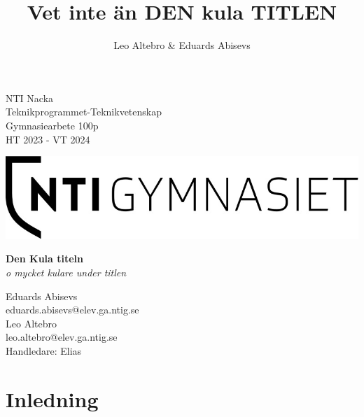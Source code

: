 \documentclass[a4paper]{article}
\title{Vet inte än DEN kula TITLEN}
\author{Leo Altebro & Eduards Abisevs}
\date{ }
\begin{document}
\begin{titlepage}
    \begin{minipage}[t]{0.48\textwidth}
        \raggedright
        NTI Nacka \\
        Teknikprogrammet-Teknikvetenskap \\
        Gymnasiearbete 100p \\
        HT 2023 - VT 2024
    \end{minipage}
    \hfill
    \begin{minipage}[t]{0.48\textwidth}
        \raggedleft
        \includegraphics[width=\linewidth]{images/logo.jpg} %
    \end{minipage}

    \vspace*{\fill} %

    \begin{center}
        \Large\textbf{Den Kula titeln}\\
        \large\textit{o mycket kulare under titlen}
    \end{center}

    \vspace*{\fill} %

    \begin{minipage}[b]{1\textwidth}
        \raggedright
        Eduards Abisevs\\
        eduards.abisevs@elev.ga.ntig.se\\
        Leo Altebro\\
        leo.altebro@elev.ga.ntig.se\\
        Handledare: Elias
    \end{minipage}
\end{titlepage}


\tableofcontents
\newpage

\section{Inledning}
\end{document}
